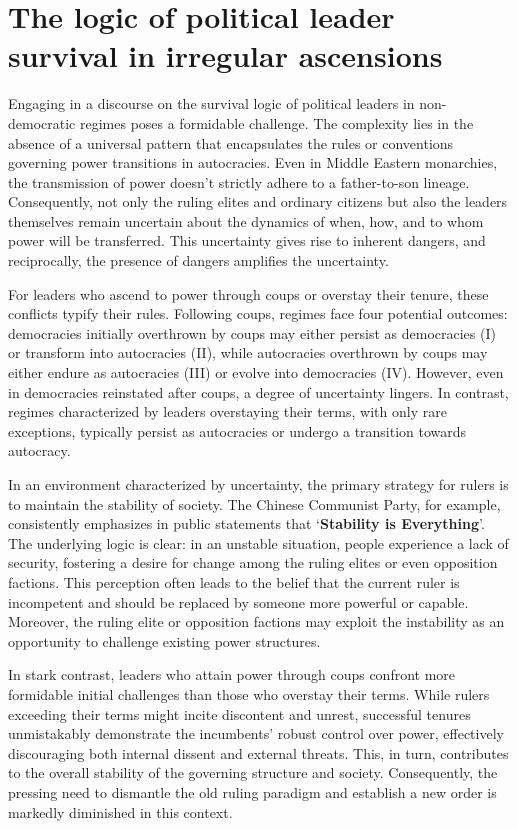 \documentclass[
  12pt,
  a4paper,
  12pt]{article}
\begin{document}
\hypertarget{the-logic-of-political-leader-survival-in-irregular-ascensions}{%
\section{The logic of political leader survival in irregular
ascensions}\label{the-logic-of-political-leader-survival-in-irregular-ascensions}}

Engaging in a discourse on the survival logic of political leaders in
non-democratic regimes poses a formidable challenge. The complexity lies
in the absence of a universal pattern that encapsulates the rules or
conventions governing power transitions in autocracies. Even in Middle
Eastern monarchies, the transmission of power doesn't strictly adhere to
a father-to-son lineage. Consequently, not only the ruling elites and
ordinary citizens but also the leaders themselves remain uncertain about
the dynamics of when, how, and to whom power will be transferred. This
uncertainty gives rise to inherent dangers, and reciprocally, the
presence of dangers amplifies the uncertainty.

For leaders who ascend to power through coups or overstay their tenure,
these conflicts typify their rules. Following coups, regimes face four
potential outcomes: democracies initially overthrown by coups may either
persist as democracies (I) or transform into autocracies (II), while
autocracies overthrown by coups may either endure as autocracies (III)
or evolve into democracies (IV). However, even in democracies reinstated
after coups, a degree of uncertainty lingers. In contrast, regimes
characterized by leaders overstaying their terms, with only rare
exceptions, typically persist as autocracies or undergo a transition
towards autocracy.

In an environment characterized by uncertainty, the primary strategy for
rulers is to maintain the stability of society. The Chinese Communist
Party, for example, consistently emphasizes in public statements that
`\textbf{Stability is Everything}'. The underlying logic is clear: in an
unstable situation, people experience a lack of security, fostering a
desire for change among the ruling elites or even opposition factions.
This perception often leads to the belief that the current ruler is
incompetent and should be replaced by someone more powerful or capable.
Moreover, the ruling elite or opposition factions may exploit the
instability as an opportunity to challenge existing power structures.

In stark contrast, leaders who attain power through coups confront more
formidable initial challenges than those who overstay their terms. While
rulers exceeding their terms might incite discontent and unrest,
successful tenures unmistakably demonstrate the incumbents' robust
control over power, effectively discouraging both internal dissent and
external threats. This, in turn, contributes to the overall stability of
the governing structure and society. Consequently, the pressing need to
dismantle the old ruling paradigm and establish a new order is markedly
diminished in this context.
\end{document}
